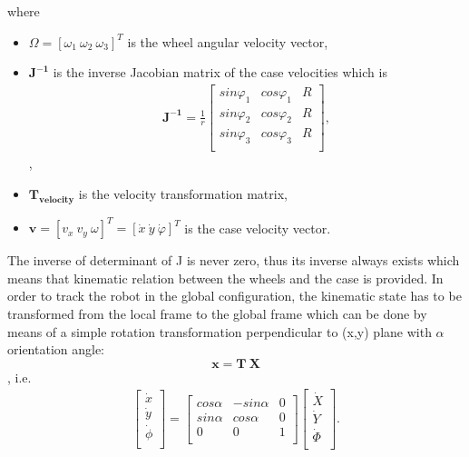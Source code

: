 \documentclass[12pt,english]{article}
\begin{document}
where
\begin{itemize}
	\item $\Omega = [\omega_1~\omega_2~\omega_3]^T$ is the wheel angular velocity vector,
	\item $\mathbf{J^{-1}}$ is the inverse Jacobian matrix of the case velocities which is
		\begin{eqnarray}
		\mathbf{J^{-1}}=\frac{1}{r} \left[
		\begin{array}{ccc}
		sin \varphi_1 & cos \varphi_1 & R \\
		sin \varphi_2 & cos \varphi_2 & R \\
		sin \varphi_3 & cos \varphi_3 & R \\
		\end{array}
		\right],
		\end{eqnarray},
	\item $\mathbf{T_{velocity}}$ is the velocity transformation matrix,
	\item $\mathbf{v} = [v_x~v_y~\omega]^T = [\dot x~\dot y~\dot \varphi]^T$ is the case velocity vector.
\end{itemize}
The inverse of determinant of J is never zero, thus its inverse always exists which means that kinematic relation between the wheels and the case is provided. In order to track the robot in the global configuration, the kinematic state has to be transformed from the local frame to the global frame which can be done by means of a simple rotation transformation perpendicular to (x,y) plane with $\alpha$ orientation angle:
\begin{equation}
\boldsymbol{x} = \mathbf{T}~\mathbf{X}
\end{equation}, i.e.
\begin{eqnarray}
\left[
\begin{array}{c}
\dot x \\
\dot y 	\\
\dot \phi \\
\end{array}
\right]=
\left[
\begin{array}{ccc}
cos \alpha 	& -sin \alpha & 0 \\
sin \alpha 	& cos \alpha & 0 \\
0	 		& 0 		 & 1 \\
\end{array}
\right]
\left[
\begin{array}{c}
\dot X \\
\dot Y 	\\
\dot \Phi \\
\end{array}
\right].
\end{eqnarray}
\end{document}
